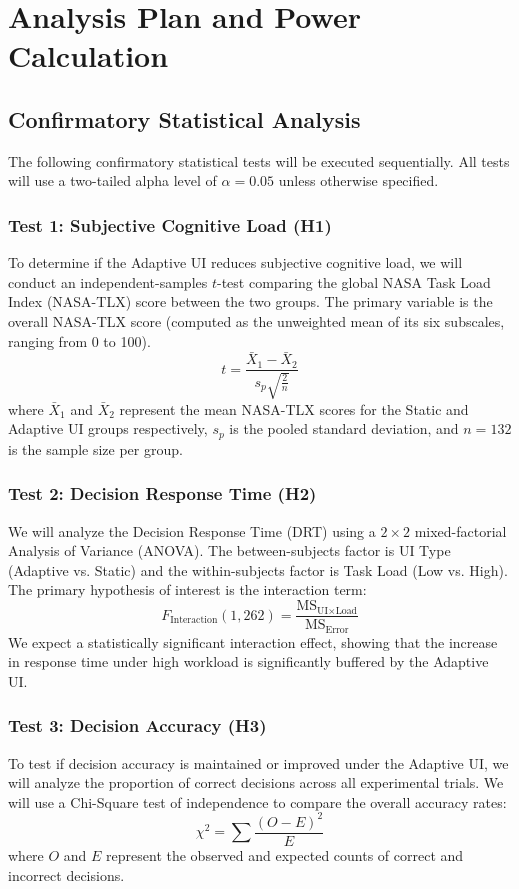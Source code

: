 \section{Analysis Plan and Power Calculation}
\label{sec:analysis}

\subsection{Confirmatory Statistical Analysis}
The following confirmatory statistical tests will be executed sequentially. All tests will use a two-tailed alpha level of $\alpha = 0.05$ unless otherwise specified.

\subsubsection{Test 1: Subjective Cognitive Load (H1)}
To determine if the Adaptive UI reduces subjective cognitive load, we will conduct an independent-samples $t$-test comparing the global NASA Task Load Index (NASA-TLX) score between the two groups. The primary variable is the overall NASA-TLX score (computed as the unweighted mean of its six subscales, ranging from 0 to 100).
\begin{equation}
t = \frac{\bar{X}_1 - \bar{X}_2}{s_p \sqrt{\frac{2}{n}}}
\end{equation}
where $\bar{X}_1$ and $\bar{X}_2$ represent the mean NASA-TLX scores for the Static and Adaptive UI groups respectively, $s_p$ is the pooled standard deviation, and $n = 132$ is the sample size per group.

\subsubsection{Test 2: Decision Response Time (H2)}
We will analyze the Decision Response Time (DRT) using a $2\times 2$ mixed-factorial Analysis of Variance (ANOVA). The between-subjects factor is UI Type (Adaptive vs. Static) and the within-subjects factor is Task Load (Low vs. High). 
The primary hypothesis of interest is the interaction term:
\begin{equation}
F_{\text{Interaction}}(1, 262) = \frac{\text{MS}_{\text{UI} \times \text{Load}}}{\text{MS}_{\text{Error}}}
\end{equation}
We expect a statistically significant interaction effect, showing that the increase in response time under high workload is significantly buffered by the Adaptive UI.

\subsubsection{Test 3: Decision Accuracy (H3)}
To test if decision accuracy is maintained or improved under the Adaptive UI, we will analyze the proportion of correct decisions across all experimental trials. We will use a Chi-Square test of independence to compare the overall accuracy rates:
\begin{equation}
\chi^2 = \sum \frac{(O - E)^2}{E}
\end{equation}
where $O$ and $E$ represent the observed and expected counts of correct and incorrect decisions.

